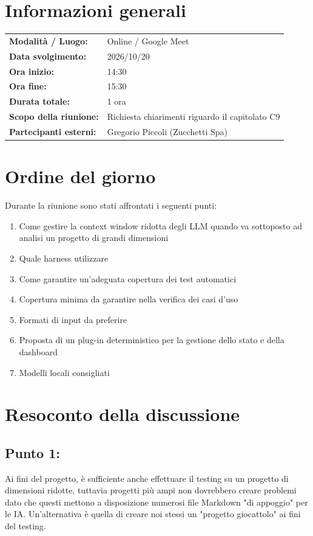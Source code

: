 \documentclass[a4paper, 11pt]{article}
\begin{document}
\newpage
\tableofcontents
\newpage


\section{Informazioni generali}
\begin{tabularx}{\textwidth}{l X}
    \textbf{Modalità / Luogo:} & Online / Google Meet \\
    \textbf{Data svolgimento:} & 2026/10/20 \\
    \textbf{Ora inizio:} & 14:30 \\
    \textbf{Ora fine:} & 15:30 \\
    \textbf{Durata totale:} & 1 ora \\
    \textbf{Scopo della riunione:} & Richiesta chiarimenti riguardo il capitolato C9 \\
    \textbf{Partecipanti esterni:} & Gregorio Piccoli (Zucchetti Spa)
\end{tabularx}

\newpage


\section{Ordine del giorno}
Durante la riunione sono stati affrontati i seguenti punti:
\begin{enumerate}
    \item Come gestire la context window ridotta degli LLM quando va sottoposto ad analisi un progetto di grandi dimensioni
    \item Quale harness utilizzare
    \item Come garantire un'adeguata copertura dei test automatici
    \item Copertura minima da garantire nella verifica dei casi d'uso
    \item Formati di input da preferire
    \item Proposta di un plug-in deterministico per la gestione dello stato e della dashboard
    \item Modelli locali consigliati
\end{enumerate}

\newpage


\section{Resoconto della discussione}

\subsection{Punto 1:}
Ai fini del progetto, è sufficiente anche effettuare il testing su un progetto di dimensioni ridotte, tuttavia progetti più ampi non dovrebbero creare problemi dato che questi mettono a disposizione numerosi file Markdown "di appoggio" per le IA.
Un'alternativa è quella di creare noi stessi un "progetto giocattolo" ai fini del testing.
\end{document}
